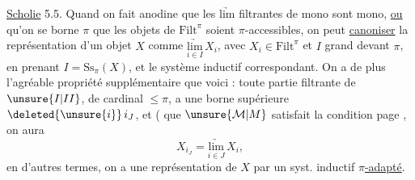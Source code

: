 

\uline{Scholie} 5.5. Quand on fait 
anodine que les $\underrightarrow{\mathrm{lim}}$ filtrantes de mono sont
mono, \uline{ou} qu'on se borne 
$\pi$  que les objets de $\mathrm{Filt}^{\pi}$ soient
$\pi$-accessibles, on peut \uline{canoniser} la
représentation d'un objet $X$ comme $\underset{i\in I}{\underrightarrow{\mathrm{lim}}}\,X_i$,
avec $X_i\in\mathrm{Filt}^{\pi}$ et  $I$ grand devant $\pi$,
en prenant $I=\mathrm{Ss}_{\pi}(X)$, et le système
inductif correspondant. 
On a de plus l'agréable propriété supplémentaire que
voici : toute partie filtrante  de $\unsure{I|II}$,
de cardinal $\leq\pi$, a une borne
supérieure $\deleted{\unsure{i}}\,i_J$, et (   que
$\unsure{\mathcal M|M}$ satisfait la condition  page ,  on
aura
\[
 X_{i_J}=\underset{i\in J}{\underrightarrow{\mathrm{lim}}}\,X_i,
\]
en d'autres termes, on a une représentation
 de $X$ par un syst. inductif 
\uline{$\pi$-adapté}.

